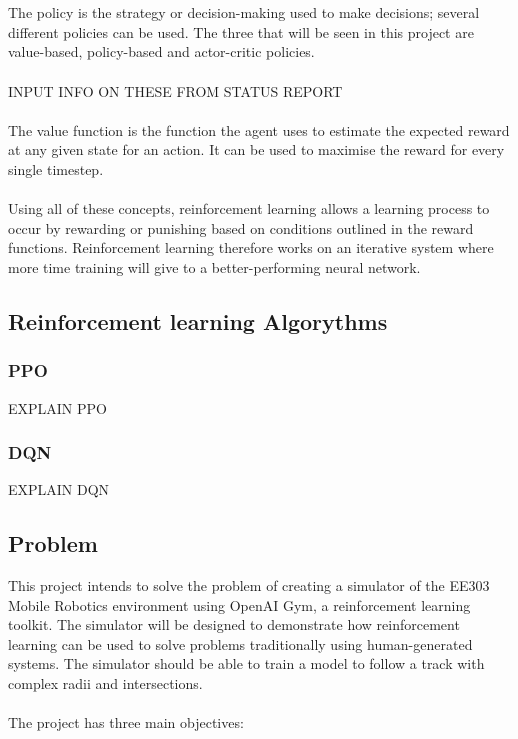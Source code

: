 \documentclass[12pt]{article}
\begin{document}
\\\\
The policy is the strategy or decision-making used to make decisions; several different policies can be used. The three that will be seen in this project are value-based, policy-based and actor-critic policies.
\\\\
INPUT INFO ON THESE FROM STATUS REPORT
\\\\
The value function is the function the agent uses to estimate the expected reward at any given state for an action. It can be used to maximise the reward for every single timestep.
\\\\
Using all of these concepts, reinforcement learning allows a learning process to occur by rewarding or punishing based on conditions outlined in the reward functions. Reinforcement learning therefore works on an iterative system where more time training will give to a better-performing neural network.

\subsection{Reinforcement learning Algorythms}
\subsubsection{PPO}

EXPLAIN PPO

\subsubsection{DQN}

EXPLAIN DQN

\subsection{Problem}

This project intends to solve the problem of creating a simulator of the EE303 Mobile Robotics environment using OpenAI Gym, a reinforcement learning toolkit. The simulator will be designed to demonstrate how reinforcement learning can be used to solve problems traditionally using human-generated systems. The simulator should be able to train a model to follow a track with complex radii and intersections.
\\\\
The project has three main objectives:
\end{document}
